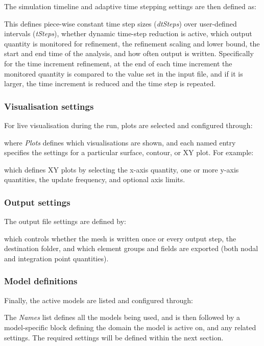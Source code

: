 \documentclass[3p]{elsarticle} %
\newcommand{\CodeSnipU}[4]{}
\begin{document}
The simulation timeline and adaptive time stepping settings are then defined as:
\CodeSnipU{TestCases/TriAxialCompression/TriAxial.json}{98}{108}{TestCases/TriAxialCompression/TriAxial.json}
This defines piece-wise constant time step sizes (\textit{dtSteps}) over user-defined intervals (\textit{tSteps}), whether dynamic time-step reduction is active, which output quantity is monitored for refinement, the refinement scaling and lower bound, the start and end time of the analysis, and how often output is written. Specifically for the time increment refinement, at the end of each time increment the monitored quantity is compared to the value set in the input file, and if it is larger, the time increment is reduced and the time step is repeated.

\subsubsection{Visualisation settings}
For live visualisation during the run, plots are selected and configured through:
\CodeSnipU{TestCases/TriAxialCompression/TriAxial.json}{109}{112}{TestCases/TriAxialCompression/TriAxial.json}
where \textit{Plots} defines which visualisations are shown, and each named entry specifies the settings for a particular surface, contour, or XY plot. For example:
\CodeSnipU{TestCases/TriAxialCompression/TriAxial.json}{159}{179}{TestCases/TriAxialCompression/TriAxial.json}
which defines XY plots by selecting the x-axis quantity, one or more y-axis quantities, the update frequency, and optional axis limits.

\subsubsection{Output settings}
The output file settings are defined by:
\CodeSnipU{TestCases/TriAxialCompression/TriAxial.json}{181}{189}{TestCases/TriAxialCompression/TriAxial.json}
which controls whether the mesh is written once or every output step, the destination folder, and which element groups and fields are exported (both nodal and integration point quantities).

\subsubsection{Model definitions}
Finally, the active models are listed and configured through:
\CodeSnipU{TestCases/TriAxialCompression/TriAxial.json}{190}{193}{TestCases/TriAxialCompression/TriAxial.json}
The \textit{Names} list defines all the models being used, and is then followed by a model-specific block defining the domain the model is active on, and any related settings. The required settings will be defined within the next section. 
\end{document}
